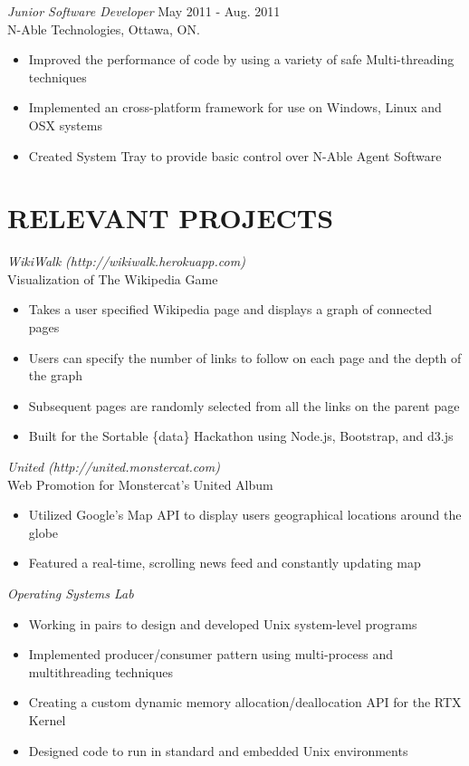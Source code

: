 \documentclass[margin]{res}
\begin{document}
\begin{resume}
{\sl Junior Software Developer} \hfill May 2011 - Aug. 2011 \\
N-Able Technologies, Ottawa, ON.
\begin{itemize} \itemsep -2pt
  \item Improved the performance of code by using a variety of safe Multi-threading techniques
  \item Implemented an cross-platform framework for use on Windows, Linux and OSX systems
  \item Created System Tray to provide basic control over N-Able Agent Software
\end{itemize}

\section{RELEVANT PROJECTS}

{\sl WikiWalk (http://wikiwalk.herokuapp.com) } \\
Visualization of The Wikipedia Game
\begin{itemize} \itemsep -2pt
  \item Takes a user specified Wikipedia page and displays a graph of connected pages
  \item Users can specify the number of links to follow on each page and the depth of the graph
  \item Subsequent pages are randomly selected from all the links on the parent page
  \item Built for the Sortable \{data\} Hackathon using Node.js, Bootstrap, and d3.js
\end{itemize}

{\sl United (http://united.monstercat.com) } \\
Web Promotion for Monstercat's United Album
\begin{itemize} \itemsep -2pt
  \item Utilized Google's Map API to display users geographical locations around the globe
  \item Featured a real-time, scrolling news feed and constantly updating map
\end{itemize}

{\sl Operating Systems Lab } %
\begin{itemize} \itemsep -2pt
  \item Working in pairs to design and developed Unix system-level programs
  \item Implemented producer/consumer pattern using multi-process and multithreading techniques
  \item Creating a custom dynamic memory allocation/deallocation API for the RTX Kernel
  \item Designed code to run in standard and embedded Unix environments
\end{itemize}



\end{resume}
\end{document}
